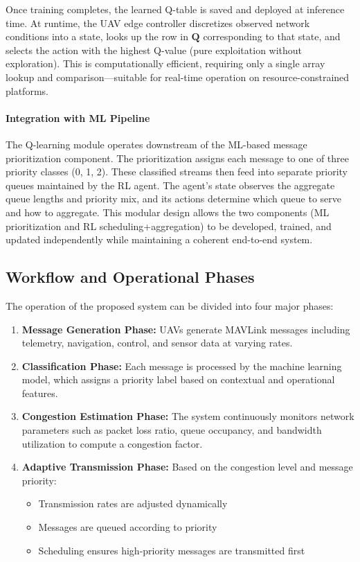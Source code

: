\documentclass[pdflatex,sn-mathphys-num]{sn-jnl}%
\theoremstyle{thmstyleone}%
\theoremstyle{thmstyletwo}%
\theoremstyle{thmstylethree}%
\begin{document}
Once training completes, the learned Q-table is saved and deployed at inference time. At runtime, the UAV edge controller discretizes observed network conditions into a state, looks up the row in $\mathbf{Q}$ corresponding to that state, and selects the action with the highest Q-value (pure exploitation without exploration). This is computationally efficient, requiring only a single array lookup and comparison—suitable for real-time operation on resource-constrained platforms.

\paragraph{Integration with ML Pipeline}

The Q-learning module operates downstream of the ML-based message prioritization component. The prioritization assigns each message to one of three priority classes (0, 1, 2). These classified streams then feed into separate priority queues maintained by the RL agent. The agent's state observes the aggregate queue lengths and priority mix, and its actions determine which queue to serve and how to aggregate. This modular design allows the two components (ML prioritization and RL scheduling+aggregation) to be developed, trained, and updated independently while maintaining a coherent end-to-end system.

\subsection{ Workflow and Operational Phases }

The operation of the proposed system can be divided into four major phases:

\begin{enumerate}
    \item \textbf{Message Generation Phase:} UAVs generate MAVLink messages including telemetry, navigation, control, and sensor data at varying rates.

    \item \textbf{Classification Phase:} Each message is processed by the machine learning model, which assigns a priority label based on contextual and operational features.

    \item \textbf{Congestion Estimation Phase:} The system continuously monitors network parameters such as packet loss ratio, queue occupancy, and bandwidth utilization to compute a congestion factor.

    \item \textbf{Adaptive Transmission Phase:} Based on the congestion level and message priority:
    \begin{itemize}
        \item Transmission rates are adjusted dynamically
        \item Messages are queued according to priority
        \item Scheduling ensures high-priority messages are transmitted first
    \end{itemize}
\end{enumerate}
\end{document}
